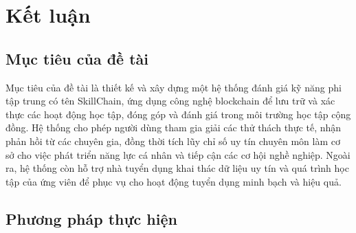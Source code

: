 \chapter{Kết luận}

\section{Mục tiêu của đề tài}

Mục tiêu của đề tài là thiết kế và xây dựng một hệ thống đánh giá kỹ năng phi tập trung có tên SkillChain, ứng dụng công nghệ blockchain để lưu trữ và xác thực các hoạt động học tập, đóng góp và đánh giá trong môi trường học tập cộng đồng.
Hệ thống cho phép người dùng tham gia giải các thử thách thực tế, nhận phản hồi từ các chuyên gia, đồng thời tích lũy chỉ số uy tín chuyên môn làm cơ sở cho việc phát triển năng lực cá nhân và tiếp cận các cơ hội nghề nghiệp.
Ngoài ra, hệ thống còn hỗ trợ nhà tuyển dụng khai thác dữ liệu uy tín và quá trình học tập của ứng viên để phục vụ cho hoạt động tuyển dụng minh bạch và hiệu quả.

\section{Phương pháp thực hiện}

